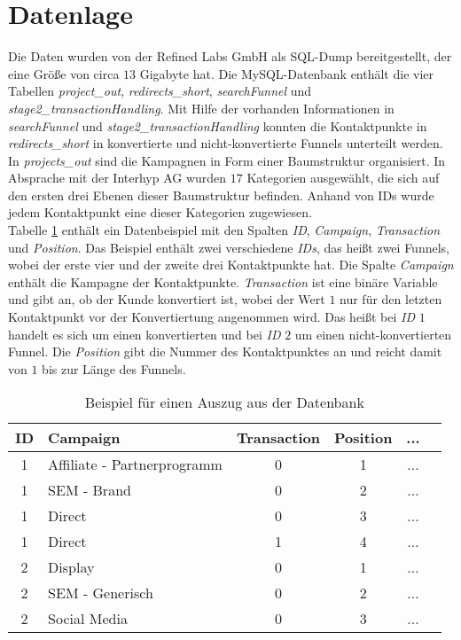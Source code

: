\section{Datenlage}\label{datenlage}

Die Daten wurden von der Refined Labs GmbH als SQL-Dump bereitgestellt, der eine Größe von circa $13$ Gigabyte hat. Die MySQL-Datenbank enthält die vier Tabellen \textit{project\_out}, \textit{redirects\_short}, \textit{searchFunnel} und \textit{stage2\_transactionHandling}. Mit Hilfe der vorhanden Informationen in \textit{searchFunnel} und \textit{stage2\_transactionHandling} konnten die Kontaktpunkte in \textit{redirects\_short} in konvertierte und nicht-konvertierte Funnels unterteilt werden. In \textit{projects\_out} sind die Kampagnen in Form einer Baumstruktur organisiert. In Absprache mit der Interhyp AG wurden $17$ Kategorien ausgewählt, die sich auf den ersten drei Ebenen dieser Baumstruktur befinden. Anhand von IDs wurde jedem Kontaktpunkt eine dieser Kategorien zugewiesen.\\
Tabelle \ref{exdata} enthält ein Datenbeispiel mit den Spalten \textit{ID}, \textit{Campaign}, \textit{Transaction} und \textit{Position}. Das Beispiel enthält zwei verschiedene \textit{IDs}, das heißt zwei Funnels, wobei der erste vier und der zweite drei Kontaktpunkte hat. Die Spalte \textit{Campaign} enthält die Kampagne der Kontaktpunkte. \textit{Transaction} ist eine binäre Variable und gibt an, ob der Kunde konvertiert ist, wobei der Wert $1$ nur für den letzten Kontaktpunkt vor der Konvertiertung angenommen wird. Das heißt bei \textit{ID} $1$ handelt es sich um einen konvertierten und bei \textit{ID} $2$ um einen nicht-konvertierten Funnel. Die \textit{Position} gibt die Nummer des Kontaktpunktes an und reicht damit von $1$ bis zur Länge des Funnels.\\
\begin{table}[H]
	\begin{center}
		\begin{tabular}{|c|l|c|c|c|c|}
			\hline
			ID & Campaign 									 & Transaction & Position & ... \\ \hline\hline
			1  & Affiliate - Partnerprogramm & 0					 & 1		    & ... \\ \hline
			1  & SEM - Brand                 & 0					 & 2		    & ... \\ \hline
			1  & Direct                      & 0					 & 3		    & ... \\ \hline
			1  & Direct                      & 1					 & 4		    & ... \\ \hline
			2  & Display                     & 0					 & 1		    & ... \\ \hline
			2  & SEM - Generisch             & 0					 & 2		    & ... \\ \hline
			2  & Social Media                & 0					 & 3		    & ... \\ \hline
		\end{tabular} 
	\end{center}
	\caption{Beispiel für einen Auszug aus der Datenbank}\label{exdata}
\end{table}
